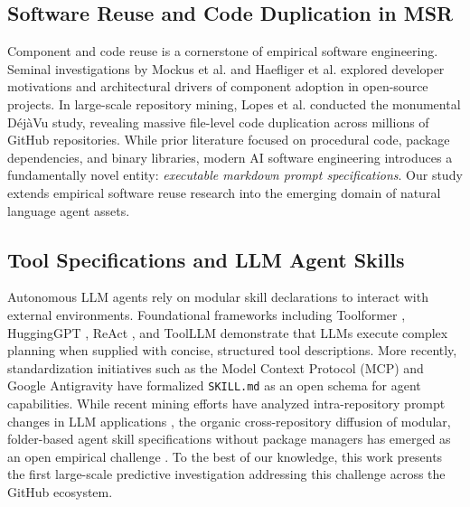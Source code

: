 \documentclass[12pt]{article}
\begin{document}
\subsection{Software Reuse and Code Duplication in MSR}
Component and code reuse is a cornerstone of empirical software engineering. Seminal investigations by Mockus et al. \cite{mockus2002two} and Haefliger et al. \cite{haefliger2008code} explored developer motivations and architectural drivers of component adoption in open-source projects. In large-scale repository mining, Lopes et al. \cite{lopes2017dejavu} conducted the monumental D{\'e}j{\`a}Vu study, revealing massive file-level code duplication across millions of GitHub repositories. While prior literature focused on procedural code, package dependencies, and binary libraries, modern AI software engineering introduces a fundamentally novel entity: \emph{executable markdown prompt specifications}. Our study extends empirical software reuse research into the emerging domain of natural language agent assets.

\subsection{Tool Specifications and LLM Agent Skills}
Autonomous LLM agents rely on modular skill declarations to interact with external environments. Foundational frameworks including Toolformer \cite{schick2023toolformer}, HuggingGPT \cite{shen2023hugginggpt}, ReAct \cite{yao2023react}, and ToolLLM \cite{qin2023toolllm} demonstrate that LLMs execute complex planning when supplied with concise, structured tool descriptions. More recently, standardization initiatives such as the Model Context Protocol (MCP) and Google Antigravity have formalized \texttt{SKILL.md} as an open schema for agent capabilities. While recent mining efforts have analyzed intra-repository prompt changes in LLM applications \cite{tafreshipour2025prompting}, the organic cross-repository diffusion of modular, folder-based agent skill specifications without package managers has emerged as an open empirical challenge \cite{gitskills2027}. To the best of our knowledge, this work presents the first large-scale predictive investigation addressing this challenge across the GitHub ecosystem.
\end{document}
